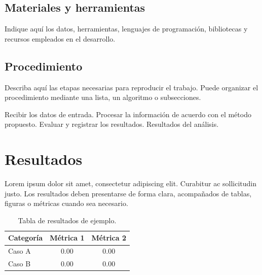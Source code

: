 \documentclass[conference]{IEEEtran}
\begin{document}
\subsection{Materiales y herramientas}
Indique aquí los datos, herramientas, lenguajes de programación, bibliotecas
y recursos empleados en el desarrollo.

\subsection{Procedimiento}
Describa aquí las etapas necesarias para reproducir el trabajo. Puede
organizar el procedimiento mediante una lista, un algoritmo o subsecciones.

\begin{algorithm}[htbp]
\caption{Procedimiento de ejemplo}
\label{alg:procedimiento}
\begin{algorithmic}[1]
\STATE Recibir los datos de entrada.
\STATE Procesar la información de acuerdo con el método propuesto.
\STATE Evaluar y registrar los resultados.
\RETURN Resultados del análisis.
\end{algorithmic}
\end{algorithm}

\section{Resultados}
Lorem ipsum dolor sit amet, consectetur adipiscing elit. Curabitur ac
sollicitudin justo. Los resultados deben presentarse de forma clara,
acompañados de tablas, figuras o métricas cuando sea necesario.

\begin{table}[htbp]
\centering
\caption{Tabla de resultados de ejemplo.}
\label{tab:resultados}
\begin{tabular}{lcc}
\toprule
Categoría & Métrica 1 & Métrica 2 \\
\midrule
Caso A & 0.00 & 0.00 \\
Caso B & 0.00 & 0.00 \\
\bottomrule
\end{tabular}
\end{table}

\end{document}
